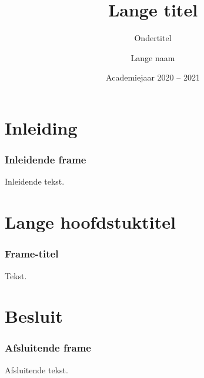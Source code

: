 \documentclass
   [kulak] %
   {kulakbeamer}
\title[Korte titel]{Lange titel}
\subtitle{Ondertitel}
\author[Korte naam]{Lange naam}
\institute[Kulak]{KU Leuven Kulak}
\date{Academiejaar 2020 -- 2021}
\begin{document}
\begin{titleframe}
\titlepage
\end{titleframe}

\begin{outlineframe}[Overzicht]
\tableofcontents
\end{outlineframe}


\section{Inleiding}

\begin{frame}
\frametitle{Inleidende frame}
Inleidende tekst.
\end{frame}

\section[Korte titel]{Lange hoofdstuktitel}

\begin{frame}
\frametitle{Frame-titel}
Tekst.
\end{frame}

\section{Besluit}
\begin{frame}
\frametitle{Afsluitende frame}
Afsluitende tekst.
\end{frame}
\end{document}
